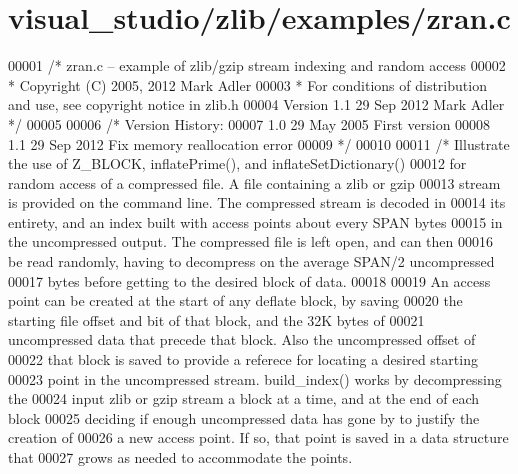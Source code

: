 \hypertarget{visual__studio_2zlib_2examples_2zran_8c_source}{}\section{visual\+\_\+studio/zlib/examples/zran.c}
\label{visual__studio_2zlib_2examples_2zran_8c_source}

\begin{DoxyCode}
00001 \textcolor{comment}{/* zran.c -- example of zlib/gzip stream indexing and random access}
00002 \textcolor{comment}{ * Copyright (C) 2005, 2012 Mark Adler}
00003 \textcolor{comment}{ * For conditions of distribution and use, see copyright notice in zlib.h}
00004 \textcolor{comment}{   Version 1.1  29 Sep 2012  Mark Adler */}
00005 
00006 \textcolor{comment}{/* Version History:}
00007 \textcolor{comment}{ 1.0  29 May 2005  First version}
00008 \textcolor{comment}{ 1.1  29 Sep 2012  Fix memory reallocation error}
00009 \textcolor{comment}{ */}
00010 
00011 \textcolor{comment}{/* Illustrate the use of Z\_BLOCK, inflatePrime(), and inflateSetDictionary()}
00012 \textcolor{comment}{   for random access of a compressed file.  A file containing a zlib or gzip}
00013 \textcolor{comment}{   stream is provided on the command line.  The compressed stream is decoded in}
00014 \textcolor{comment}{   its entirety, and an index built with access points about every SPAN bytes}
00015 \textcolor{comment}{   in the uncompressed output.  The compressed file is left open, and can then}
00016 \textcolor{comment}{   be read randomly, having to decompress on the average SPAN/2 uncompressed}
00017 \textcolor{comment}{   bytes before getting to the desired block of data.}
00018 \textcolor{comment}{}
00019 \textcolor{comment}{   An access point can be created at the start of any deflate block, by saving}
00020 \textcolor{comment}{   the starting file offset and bit of that block, and the 32K bytes of}
00021 \textcolor{comment}{   uncompressed data that precede that block.  Also the uncompressed offset of}
00022 \textcolor{comment}{   that block is saved to provide a referece for locating a desired starting}
00023 \textcolor{comment}{   point in the uncompressed stream.  build\_index() works by decompressing the}
00024 \textcolor{comment}{   input zlib or gzip stream a block at a time, and at the end of each block}
00025 \textcolor{comment}{   deciding if enough uncompressed data has gone by to justify the creation of}
00026 \textcolor{comment}{   a new access point.  If so, that point is saved in a data structure that}
00027 \textcolor{comment}{   grows as needed to accommodate the points.}

\end{DoxyCode}
